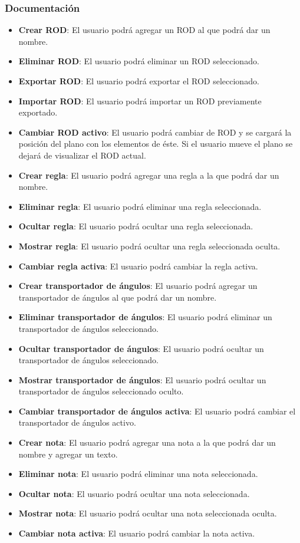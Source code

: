 \subsubsection{Documentación}

\begin{itemize}
	\item \textbf{Crear ROD}: El usuario podrá agregar un ROD al que podrá dar un nombre.
	\item \textbf{Eliminar ROD}: El usuario podrá eliminar un ROD seleccionado.
	\item \textbf{Exportar ROD}: El usuario podrá exportar el ROD seleccionado.
	\item \textbf{Importar ROD}: El usuario podrá importar un ROD previamente exportado.
	\item \textbf{Cambiar ROD activo}: El usuario podrá cambiar de ROD y se cargará la posición del plano con los elementos de éste. Si el usuario mueve el plano se dejará de visualizar el ROD actual.
	\item \textbf{Crear regla}: El usuario podrá agregar una regla a la que podrá dar un nombre.
	\item \textbf{Eliminar regla}: El usuario podrá eliminar una regla seleccionada.
	\item \textbf{Ocultar regla}: El usuario podrá ocultar una regla seleccionada.
	\item \textbf{Mostrar regla}: El usuario podrá ocultar una regla seleccionada oculta.
	\item \textbf{Cambiar regla activa}: El usuario podrá cambiar la regla activa.
	\item \textbf{Crear transportador de ángulos}: El usuario podrá agregar un transportador de ángulos al que podrá dar un nombre.
	\item \textbf{Eliminar transportador de ángulos}: El usuario podrá eliminar un transportador de ángulos seleccionado.
	\item \textbf{Ocultar transportador de ángulos}: El usuario podrá ocultar un transportador de ángulos seleccionado.
	\item \textbf{Mostrar transportador de ángulos}: El usuario podrá ocultar un transportador de ángulos seleccionado oculto.
	\item \textbf{Cambiar transportador de ángulos activa}: El usuario podrá cambiar el transportador de ángulos activo.
	\item \textbf{Crear nota}: El usuario podrá agregar una nota a la que podrá dar un nombre y agregar un texto.
	\item \textbf{Eliminar nota}: El usuario podrá eliminar una nota seleccionada.
	\item \textbf{Ocultar nota}: El usuario podrá ocultar una nota seleccionada.
	\item \textbf{Mostrar nota}: El usuario podrá ocultar una nota seleccionada oculta.
	\item \textbf{Cambiar nota activa}: El usuario podrá cambiar la nota activa.
\end{itemize}

